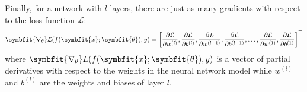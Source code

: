 Finally, for a network with $l$ layers, there are just as many gradients with respect to the loss function $\mathcal{L}$:
\begin{equation}
    \symbfit{\nabla_{\theta}} \mathcal{L}(f(\symbfit{x};\symbfit{\theta}), y) = \bigg[\frac{\partial \mathcal{L}}{\partial w^{(l)}}, \frac{\partial \mathcal{L}}{\partial b^{(l)}}, \frac{\partial L}{\partial w^{(l-1)}}, \frac{\partial \mathcal{L}}{\partial b^{(l-1)}}, \ldots, \frac{\partial \mathcal{L}}{\partial w^{(1)}}, \frac{\partial \mathcal{L}}{\partial b^{(1)}}\bigg]^\top
\end{equation}
where $\symbfit{\nabla_{\theta}} L(f(\symbfit{x};\symbfit{\theta}), y)$ is a vector of partial derivatives with respect to the weights in the neural network model while $w^{(l)}$ and $b^{(l)}$ are the weights and biases of layer $l$.
